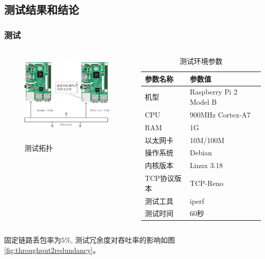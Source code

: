 \subsection{测试结果和结论}
\begin{frame}[allowframebreaks]
	\frametitle{测试}
	\begin{columns}
		\begin{column}{0.4\textwidth}
			\begin{figure}
				\includegraphics[height=4cm]{../figures/tuopu.eps}
				\label{fig:tuopu}
				\caption{测试拓扑}
			\end{figure}
		\end{column}
		\begin{column}{0.6\textwidth}
			\vspace{-1.5em}
			\begin{table}[htp]
				\centering
				\small
				\caption{测试环境参数}
				\label{tab:ceshicanshu}
				\begin{tabular}{ll}
					\toprule
					参数名称&参数值\tabularnewline
					\midrule
					机型		&Raspberry Pi 2 Model B\tabularnewline
					CPU		&900MHz Cortex-A7\tabularnewline
					RAM			&1G\tabularnewline
					以太网卡 	&10M/100M\tabularnewline
					操作系统 &Debian\tabularnewline
					内核版本 &Linux 3.18\tabularnewline
					TCP协议版本 &TCP-Reno\tabularnewline
					测试工具 &iperf\tabularnewline
					测试时间 &60秒\tabularnewline
					\bottomrule
				\end{tabular}
			\end{table}
		\end{column}
	\end{columns}
	\newpage
	固定链路丢包率为$5\%$,
	测试冗余度对吞吐率的影响如图\ref{fig:throughput2redundancy}。
	

\end{frame}
